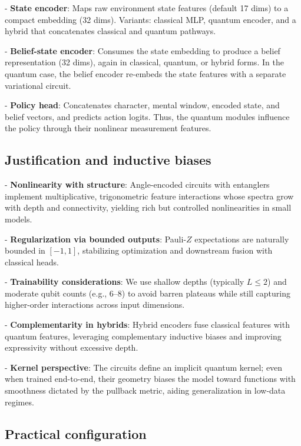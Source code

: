 \documentclass[11pt]{article}
\begin{document}
- \textbf{State encoder}: Maps raw environment state features (default 17 dims) to a compact embedding (32 dims). Variants: classical MLP, quantum encoder, and a hybrid that concatenates classical and quantum pathways.

- \textbf{Belief-state encoder}: Consumes the state embedding to produce a belief representation (32 dims), again in classical, quantum, or hybrid forms. In the quantum case, the belief encoder re-embeds the state features with a separate variational circuit.

- \textbf{Policy head}: Concatenates character, mental window, encoded state, and belief vectors, and predicts action logits. Thus, the quantum modules influence the policy through their nonlinear measurement features.

\subsection{Justification and inductive biases}

- \textbf{Nonlinearity with structure}: Angle-encoded circuits with entanglers implement multiplicative, trigonometric feature interactions whose spectra grow with depth and connectivity, yielding rich but controlled nonlinearities in small models.

- \textbf{Regularization via bounded outputs}: Pauli-$Z$ expectations are naturally bounded in \([-1,1]\), stabilizing optimization and downstream fusion with classical heads.

- \textbf{Trainability considerations}: We use shallow depths (typically \(L\leq 2\)) and moderate qubit counts (e.g., 6--8) to avoid barren plateaus while still capturing higher-order interactions across input dimensions.

- \textbf{Complementarity in hybrids}: Hybrid encoders fuse classical features with quantum features, leveraging complementary inductive biases and improving expressivity without excessive depth.

- \textbf{Kernel perspective}: The circuits define an implicit quantum kernel; even when trained end-to-end, their geometry biases the model toward functions with smoothness dictated by the pullback metric, aiding generalization in low-data regimes.

\subsection{Practical configuration}
\end{document}
